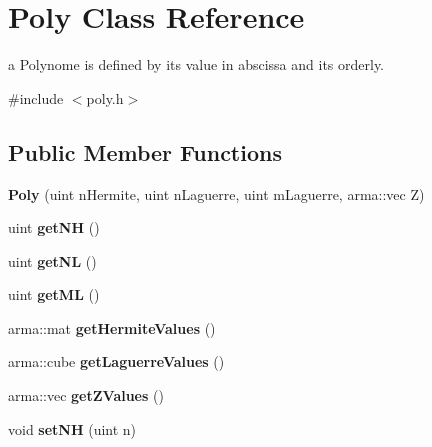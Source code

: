 \hypertarget{classPoly}{}\section{Poly Class Reference}
\label{classPoly}


a Polynome is defined by its value in abscissa and its orderly.  




{\ttfamily \#include $<$poly.\+h$>$}

\subsection*{Public Member Functions}
\begin{DoxyCompactItemize}
\item 
{\bfseries Poly} (uint n\+Hermite, uint n\+Laguerre, uint m\+Laguerre, arma\+::vec Z)\hypertarget{classPoly_ac4c70cdc8021ed99c90d247ba5911392}{}\label{classPoly_ac4c70cdc8021ed99c90d247ba5911392}

\item 
uint {\bfseries get\+NH} ()\hypertarget{classPoly_a09b39ad29e8f86d3865182c07d8b9f62}{}\label{classPoly_a09b39ad29e8f86d3865182c07d8b9f62}

\item 
uint {\bfseries get\+NL} ()\hypertarget{classPoly_a9beab6e81373a7a65382517313ebddc4}{}\label{classPoly_a9beab6e81373a7a65382517313ebddc4}

\item 
uint {\bfseries get\+ML} ()\hypertarget{classPoly_ad0b37c94561ae0511f475871d384e916}{}\label{classPoly_ad0b37c94561ae0511f475871d384e916}

\item 
arma\+::mat {\bfseries get\+Hermite\+Values} ()\hypertarget{classPoly_ac5a6b078cd8b41e9465c7992bb399580}{}\label{classPoly_ac5a6b078cd8b41e9465c7992bb399580}

\item 
arma\+::cube {\bfseries get\+Laguerre\+Values} ()\hypertarget{classPoly_a84cb41ff5c1a40e544419fcc38ab0b01}{}\label{classPoly_a84cb41ff5c1a40e544419fcc38ab0b01}

\item 
arma\+::vec {\bfseries get\+Z\+Values} ()\hypertarget{classPoly_a51084101c1beb857fe23e5e9f67e52da}{}\label{classPoly_a51084101c1beb857fe23e5e9f67e52da}

\item 
void {\bfseries set\+NH} (uint n)\hypertarget{classPoly_a00adf49ddded6d28c3a4c9694ef9ac72}{}\label{classPoly_a00adf49ddded6d28c3a4c9694ef9ac72}


\end{DoxyCompactItemize}
